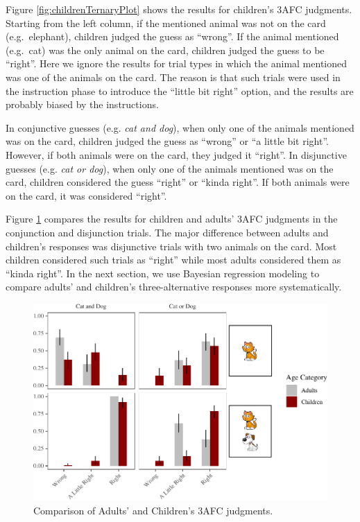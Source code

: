 \documentclass[floatsintext,man]{apa6}
\theoremstyle{definition}
\theoremstyle{definition}
\theoremstyle{definition}
\theoremstyle{remark}
\begin{document}
Figure \ref{fig:childrenTernaryPlot} shows the results for children's
3AFC judgments. Starting from the left column, if the mentioned animal
was not on the card (e.g.~elephant), children judged the guess as
\enquote{wrong}. If the animal mentioned (e.g.~cat) was the only animal
on the card, children judged the guess to be \enquote{right}. Here we
ignore the results for trial types in which the animal mentioned was one
of the animals on the card. The reason is that such trials were used in
the instruction phase to introduce the \enquote{little bit right}
option, and the results are probably biased by the instructions.

In conjunctive guesses (e.g. \emph{cat and dog}), when only one of the
animals mentioned was on the card, children judged the guess as
\enquote{wrong} or \enquote{a little bit right}. However, if both
animals were on the card, they judged it \enquote{right}. In disjunctive
guesses (e.g. \emph{cat or dog}), when only one of the animals mentioned
was on the card, children considered the guess \enquote{right} or
\enquote{kinda right}. If both animals were on the card, it was
considered \enquote{right}.

Figure \ref{fig:childAdultComp} compares the results for children and
adults' 3AFC judgments in the conjunction and disjunction trials. The
major difference between adults and children's responses was disjunctive
trials with two animals on the card. Most children considered such
trials as \enquote{right} while most adults considered them as
\enquote{kinda right}. In the next section, we use Bayesian regression
modeling to compare adults' and children's three-alternative responses
more systematically.

\begin{figure}
\centering
\includegraphics{figs/childAdultComp-1.pdf}
\caption{\label{fig:childAdultComp}Comparison of Adults' and Children's 3AFC
judgments.}
\end{figure}
\end{document}
